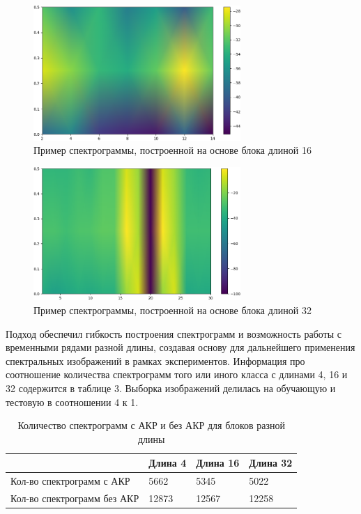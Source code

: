 \documentclass[spec, och, diploma]{SCWorks}
\begin{document}
        \begin{figure}[H]
            \centering
            \includegraphics[width=0.7\textwidth]{pic/spect16.png}
            \caption{Пример спектрограммы, построенной на основе блока длиной 16}
        \end{figure}

        \begin{figure}[H]
            \centering
            \includegraphics[width=0.7\textwidth]{pic/spect32.png}
            \caption{Пример спектрограммы, построенной на основе блока длиной 32}
        \end{figure}

        Подход обеспечил гибкость построения спектрограмм и возможность работы с
        временными рядами разной длины, создавая основу для дальнейшего
        применения спектральных изображений в рамках экспериментов. Информация
        про соотношение количества спектрограмм того или иного класса с длинами
        4, 16 и 32 содержится в таблице 3. Выборка изображений делилась на
        обучающую и тестовую в соотношении 4 к 1.

        \begin{table}[h]
            \centering
            \begin{tabular}{l|l|l|l|}
            \cline{2-4}
                                                              & Длина 4 & Длина 16 & Длина 32 \\ \hline
            \multicolumn{1}{|l|}{Кол-во спектрограмм с АКР}   & 5662    & 5345     & 5022     \\ \hline
            \multicolumn{1}{|l|}{Кол-во спектрограмм без АКР} & 12873   & 12567    & 12258    \\ \hline
            \end{tabular}
            \captionsetup{justification=centering}
            \caption{Количество спектрограмм с АКР и без АКР для блоков разной длины}
        \end{table}        
\end{document}
